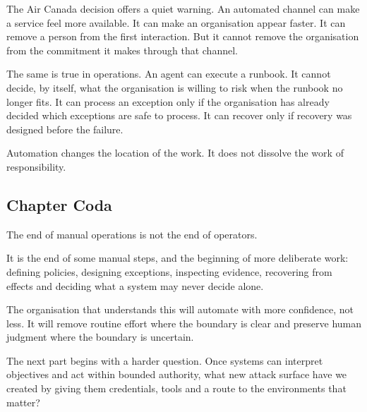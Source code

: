 The Air Canada decision offers a quiet warning. An automated channel can
make a service feel more available. It can make an organisation appear
faster. It can remove a person from the first interaction. But it cannot
remove the organisation from the commitment it makes through that
channel.

The same is true in operations. An agent can execute a runbook. It
cannot decide, by itself, what the organisation is willing to risk when
the runbook no longer fits. It can process an exception only if the
organisation has already decided which exceptions are safe to process.
It can recover only if recovery was designed before the failure.

Automation changes the location of the work. It does not dissolve the
work of responsibility.

\subsection{Chapter Coda}\label{chapter-coda}

The end of manual operations is not the end of operators.

It is the end of some manual steps, and the beginning of more deliberate
work: defining policies, designing exceptions, inspecting evidence,
recovering from effects and deciding what a system may never decide
alone.

The organisation that understands this will automate with more
confidence, not less. It will remove routine effort where the boundary
is clear and preserve human judgment where the boundary is uncertain.

The next part begins with a harder question. Once systems can interpret
objectives and act within bounded authority, what new attack surface
have we created by giving them credentials, tools and a route to the
environments that matter?
